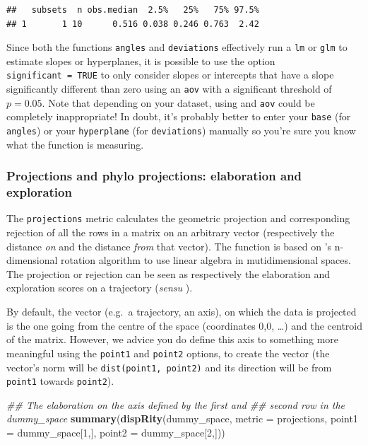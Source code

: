 \documentclass[
]{book}
\newenvironment{Shaded}{\begin{snugshade}}{\end{snugshade}}
\newcommand{\CommentTok}[1]{\textcolor[rgb]{0.56,0.35,0.01}{\textit{#1}}}
\newcommand{\DataTypeTok}[1]{\textcolor[rgb]{0.13,0.29,0.53}{#1}}
\newcommand{\DecValTok}[1]{\textcolor[rgb]{0.00,0.00,0.81}{#1}}
\newcommand{\KeywordTok}[1]{\textcolor[rgb]{0.13,0.29,0.53}{\textbf{#1}}}
\newcommand{\NormalTok}[1]{#1}
\begin{document}
\begin{verbatim}
##   subsets  n obs.median  2.5%   25%   75% 97.5%
## 1       1 10      0.516 0.038 0.246 0.763  2.42
\end{verbatim}

Since both the functions \texttt{angles} and \texttt{deviations} effectively run a \texttt{lm} or \texttt{glm} to estimate slopes or hyperplanes, it is possible to use the option \texttt{significant\ =\ TRUE} to only consider slopes or intercepts that have a slope significantly different than zero using an \texttt{aov} with a significant threshold of \(p = 0.05\).
Note that depending on your dataset, using and \texttt{aov} could be completely inappropriate!
In doubt, it's probably better to enter your \texttt{base} (for \texttt{angles}) or your \texttt{hyperplane} (for \texttt{deviations}) manually so you're sure you know what the function is measuring.

\hypertarget{projections}{%
\subsubsection{Projections and phylo projections: elaboration and exploration}\label{projections}}

The \texttt{projections} metric calculates the geometric projection and corresponding rejection of all the rows in a matrix on an arbitrary vector (respectively the distance \emph{on} and the distance \emph{from} that vector). The function is based on \citet{aguilera2004}'s n-dimensional rotation algorithm to use linear algebra in mutidimensional spaces. The projection or rejection can be seen as respectively the elaboration and exploration scores on a trajectory (\emph{sensu} \citet{endler2005}).

By default, the vector (e.g.~a trajectory, an axis), on which the data is projected is the one going from the centre of the space (coordinates 0,0, \ldots) and the centroid of the matrix.
However, we advice you do define this axis to something more meaningful using the \texttt{point1} and \texttt{point2} options, to create the vector (the vector's norm will be \texttt{dist(point1,\ point2)} and its direction will be from \texttt{point1} towards \texttt{point2}).

\begin{Shaded}
\begin{Highlighting}[]
\CommentTok{\#\# The elaboration on the axis defined by the first and}
\CommentTok{\#\# second row in the dummy\_space}
\KeywordTok{summary}\NormalTok{(}\KeywordTok{dispRity}\NormalTok{(dummy\_space, }\DataTypeTok{metric =}\NormalTok{ projections,}
                              \DataTypeTok{point1 =}\NormalTok{ dummy\_space[}\DecValTok{1}\NormalTok{,],}
                              \DataTypeTok{point2 =}\NormalTok{ dummy\_space[}\DecValTok{2}\NormalTok{,]))}
\end{Highlighting}
\end{Shaded}
\end{document}
